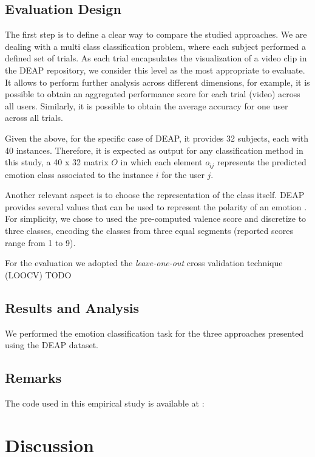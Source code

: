 \documentclass{sig-alternate}
\begin{document}
\subsection{ Evaluation Design} 

The first step is to define a clear way to compare the 
studied approaches. We are dealing with a multi class classification
problem, where  each subject performed a defined set of trials. As
each trial encapsulates the visualization of a video clip in the DEAP 
repository, we consider
this level as the most appropriate to evaluate. It allows to perform 
further analysis across different dimensions, for example, it is possible
to obtain an aggregated performance score for each  trial (video) 
across all users. Similarly, it is possible to obtain the average 
accuracy for one 
user across all trials.

Given the above,  for the specific case of DEAP, it provides 32
subjects, 
each with 40 instances. Therefore, it is expected as output for any 
classification method in this study, a  40 x 32 matrix  $O$ in  which 
each element $o_{ij}$ represents the predicted emotion class 
associated to the instance $i$ for the user $j$.
 
Another relevant aspect is to choose the representation of the 
class itself. DEAP provides several  values that can be used to 
represent the polarity of an emotion . For simplicity, we chose to used 
the pre-computed valence score  and discretize to three classes, 
encoding the classes from three equal segments (reported scores
range from 1 to 9). 

For the evaluation we adopted the \emph{leave-one-out} cross 
validation technique (LOOCV)\cite{elisseeff2003leave,kearns1999algorithmic}
TODO
\subsection{ Results and Analysis}

We performed the emotion classification task for the three approaches presented
using the DEAP dataset.




\subsection{Remarks}

The code used in this empirical study is available at : 

\section{Discussion}
\label{discussion}
\end{document}
